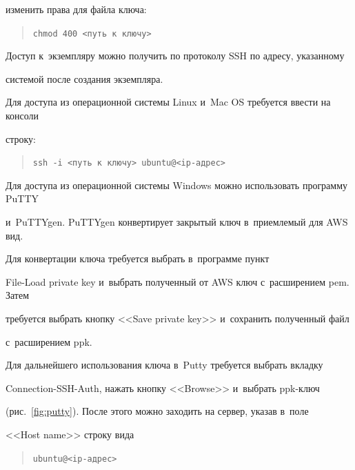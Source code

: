 изменить права для файла ключа:


\begin{quote}


\tt{chmod 400 <путь к~ключу>}


\end{quote}





Доступ к~экземпляру можно получить по протоколу SSH по адресу, указанному 


системой после создания экземпляра.


Для доступа из операционной системы Linux и~Mac OS требуется ввести на консоли 


строку:


\begin{quote}


\tt{ssh -i <путь к~ключу> ubuntu@<ip-адрес>}


\end{quote}





Для доступа из операционной системы Windows можно использовать программу PuTTY 


и~PuTTYgen. PuTTYgen конвертирует закрытый ключ в~приемлемый для AWS вид.


Для конвертации ключа требуется выбрать в~программе пункт


File-Load private key и~выбрать полученный от AWS ключ с~расширением pem. Затем 


требуется выбрать кнопку <<Save private key>> и~сохранить полученный файл 


с~расширением ppk.





Для дальнейшего использования ключа в~Putty требуется выбрать вкладку 


Connection-SSH-Auth, нажать кнопку <<Browse>> и~выбрать ppk-ключ 


(рис.~\ref{fig:putty}). После этого можно заходить на сервер, указав в~поле 


<<Host name>> строку вида


\begin{quote}


\tt{ubuntu@<ip-адрес>}


\end{quote}




















